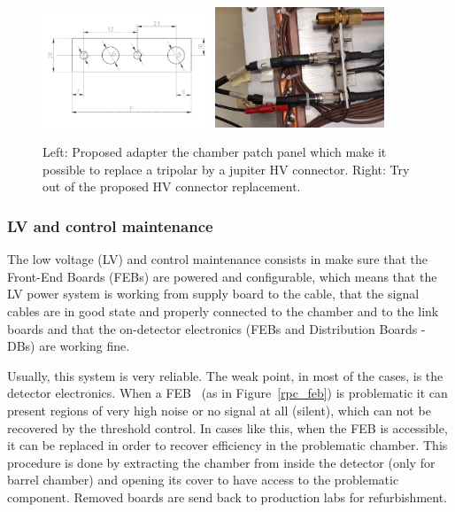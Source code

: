 \begin{figure}[!htbp]
\begin{center}
\includegraphics[width=0.45\textwidth,keepaspectratio]{figures/rpc/endcap_hv_pp.pdf}\hspace*{1.cm}
\includegraphics[width=0.45\textwidth,keepaspectratio]{figures/rpc/endcap_hv_pp_tryout.jpg}\hspace*{1.cm}
\end{center}\vspace*{-.5cm}
\caption{Left: Proposed adapter the chamber patch panel which make it possible to replace a tripolar by a jupiter HV connector. Right: Try out of the proposed HV connector replacement.}
\label{jupiterized}
\end{figure}

\subsubsection{LV and control maintenance}

The low voltage (LV) and control maintenance consists in make sure that the Front-End Boards (FEBs) are powered and configurable, which means that the LV power system is working from supply board to the cable, that the signal cables are in good state and properly connected to the chamber and to the link boards and that the on-detector electronics (FEBs and Distribution Boards - DBs) are working fine.

Usually, this system is very reliable. The weak point, in most of the cases, is the detector electronics. When a FEB~\cite{rpc_feb} (as in Figure~\ref{rpc_feb}) is problematic it can present regions of very high noise or no signal at all (silent), which can not be recovered by the threshold control. In cases like this, when the FEB is accessible, it can be replaced in order to recover efficiency in the problematic chamber. This procedure is done by extracting the chamber from inside the detector (only for barrel chamber) and opening its cover to have access to the problematic component. Removed boards are send back to production labs for refurbishment.


